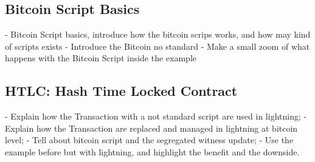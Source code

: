 \subsection{Bitcoin Script Basics}

- Bitcoin Script basics, introduce how the bitcoin scrips works, and how may
kind of scripts exists
- Introduce the Bitcoin no standard
- Make a small zoom of what happens with the Bitcoin Script inside the example

\subsection{HTLC: Hash Time Locked Contract}
\label{sec:htlc_intro}

- Explain how the Transaction with a not standard script are used in lightning;
- Explain how the Transaction are replaced and managed in lightning at bitcoin level;
- Tell about bitcoin script and the segregated witness update;
- Use the example before but with lightning, and highlight the benefit and the downside.

